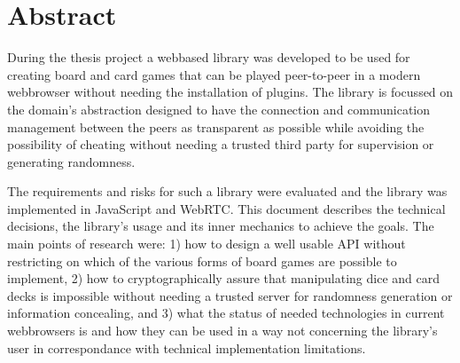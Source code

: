 
\chapter*{Abstract}

During the thesis project a webbased library was developed to be used for
creating board and card games that can be played peer-to-peer in a modern
webbrowser without needing the installation of plugins. The library is focussed
on the domain's abstraction designed to have the connection and communication
management between the peers as transparent as possible while avoiding the
possibility of cheating without needing a trusted third party for supervision or
generating randomness.

The requirements and risks for such a library were evaluated and the library was
implemented in JavaScript and WebRTC. This document describes the technical
decisions, the library's usage and its inner mechanics to achieve the goals. The
main points of research were: 1) how to design a well usable API without
restricting on which of the various forms of board games are possible to
implement, 2) how to cryptographically assure that manipulating dice and card
decks is impossible without needing a trusted server for randomness generation
or information concealing, and 3) what the status of needed technologies in
current webbrowsers is and how they can be used in a way not concerning the
library's user in correspondance with technical implementation limitations.

